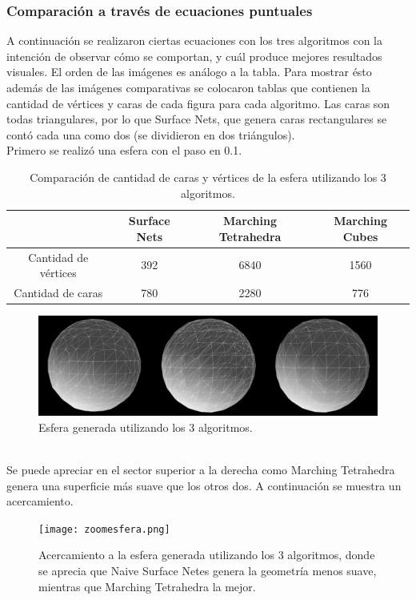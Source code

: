 \documentclass[12pt]{article}
\begin{document}
\subsubsection{Comparación a través de ecuaciones puntuales}
A continuación se realizaron ciertas ecuaciones con los tres algoritmos con la intención de observar cómo se comportan, y cuál produce mejores resultados visuales. El orden de las imágenes es análogo a la tabla. Para mostrar ésto además de las imágenes comparativas se colocaron tablas que contienen la cantidad de vértices y caras de cada figura para cada algoritmo. Las caras son todas triangulares, por lo que Surface Nets, que genera caras rectangulares se contó cada una como dos (se dividieron en dos triángulos).
\\Primero se realizó una esfera con el paso en 0.1.
\begin{table}[h!]
  \centering
  \label{tab:table1}
  \begin{tabular}{cccc}
    \toprule
    & Surface Nets & Marching Tetrahedra & Marching Cubes\\
    \midrule
    Cantidad de vértices & 392 & 6840 & 1560\\
    Cantidad de caras & 780 & 2280 & 776\\
    \bottomrule
  \end{tabular}
  \caption{Comparación de cantidad de caras y vértices de la esfera utilizando los 3 algoritmos.}
\end{table}
\begin{figure}[h!]
\includegraphics[width=\linewidth,center]{compec1.png}
\caption{Esfera generada utilizando los 3 algoritmos.}
\end{figure}
\\Se puede apreciar en el sector superior a la derecha como Marching Tetrahedra genera una superficie más suave que los otros dos. A continuación se muestra un acercamiento.
\begin{figure}[h!]
\texttt{[image: zoomesfera.png]}
\caption{Acercamiento a la esfera generada utilizando los 3 algoritmos, donde se aprecia que Naive Surface Netes genera la geometría menos suave, mientras que Marching Tetrahedra la mejor.}
\end{figure}
\end{document}
